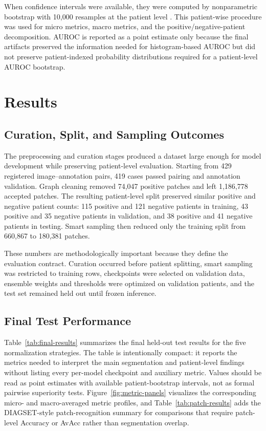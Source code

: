 \documentclass[a4paper,fleqn]{cas-dc}
\begin{document}
When confidence intervals were available, they were computed by nonparametric bootstrap with 10,000 resamples at the patient level \cite{efron1979bootstrap}. This patient-wise procedure was used for micro metrics, macro metrics, and the positive/negative-patient decomposition. AUROC is reported as a point estimate only because the final artifacts preserved the information needed for histogram-based AUROC but did not preserve patient-indexed probability distributions required for a patient-level AUROC bootstrap.

\section{Results}

\subsection{Curation, Split, and Sampling Outcomes}

The preprocessing and curation stages produced a dataset large enough for model development while preserving patient-level evaluation. Starting from 429 registered image--annotation pairs, 419 cases passed pairing and annotation validation. Graph cleaning removed 74,047 positive patches and left 1,186,778 accepted patches. The resulting patient-level split preserved similar positive and negative patient counts: 115 positive and 121 negative patients in training, 43 positive and 35 negative patients in validation, and 38 positive and 41 negative patients in testing. Smart sampling then reduced only the training split from 660,867 to 180,381 patches.

These numbers are methodologically important because they define the evaluation contract. Curation occurred before patient splitting, smart sampling was restricted to training rows, checkpoints were selected on validation data, ensemble weights and thresholds were optimized on validation patients, and the test set remained held out until frozen inference.

\subsection{Final Test Performance}

Table~\ref{tab:final-results} summarizes the final held-out test results for the five normalization strategies. The table is intentionally compact: it reports the metrics needed to interpret the main segmentation and patient-level findings without listing every per-model checkpoint and auxiliary metric. Values should be read as point estimates with available patient-bootstrap intervals, not as formal pairwise superiority tests. Figure~\ref{fig:metric-panels} visualizes the corresponding micro- and macro-averaged metric profiles, and Table~\ref{tab:patch-results} adds the DIAGSET-style patch-recognition summary for comparisons that require patch-level Accuracy or AvAcc rather than segmentation overlap.
\end{document}

